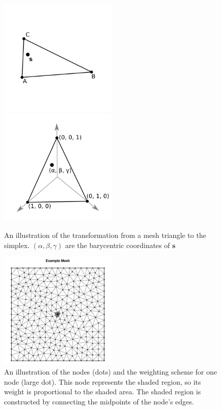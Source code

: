 \documentclass[]{interact}
\begin{document}
\begin{figure}[p]
\includegraphics[width=0.5\textwidth]{figures/triangle.png}
\includegraphics[width=0.5\textwidth]{figures/simplex.png}
\caption{An illustration of the transformation from a mesh triangle to the
simplex. \((\alpha, \beta, \gamma)\) are the barycentric coordinates of
\(\mathbf{s}\)}
\label{triangle}
\end{figure}

\begin{figure}[h]\centering
\includegraphics[width=0.5\textwidth]{figures/dual.pdf}
\caption{An illustration of the nodes (dots) and the weighting scheme for one
node (large dot). This node represents the shaded region, so its weight is
proportional to the shaded area. The shaded region is constructed by connecting
the midpoints of the node's edges.}
\label{dual}
\end{figure}
\end{document}
